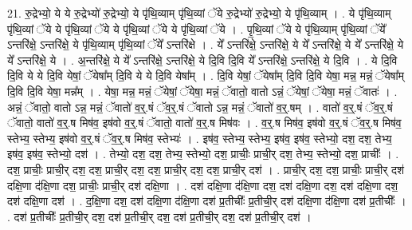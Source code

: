 \documentclass[17pt]{extarticle}
\begin{document}
21. रु॒द्रेभ्यो॒ ये ये रु॒द्रेभ्यो॑ रु॒द्रेभ्यो॒ ये पृ॑थि॒व्याम् पृ॑थि॒व्यां ॅये रु॒द्रेभ्यो॑ रु॒द्रेभ्यो॒ ये पृ॑थि॒व्याम् । . ये पृ॑थि॒व्याम् पृ॑थि॒व्यां ॅये ये पृ॑थि॒व्यां ॅये ये पृ॑थि॒व्यां ॅये ये पृ॑थि॒व्यां ॅये । . पृ॒थि॒व्यां ॅये ये पृ॑थि॒व्याम् पृ॑थि॒व्यां ॅये᳚ ऽन्तरि॑क्षे॒ ऽन्तरि॑क्षे॒ ये पृ॑थि॒व्याम् पृ॑थि॒व्यां ॅये᳚ ऽन्तरि॑क्षे । . ये᳚ ऽन्तरि॑क्षे॒ ऽन्तरि॑क्षे॒ ये ये᳚ ऽन्तरि॑क्षे॒ ये ये᳚ ऽन्तरि॑क्षे॒ ये ये᳚ ऽन्तरि॑क्षे॒ ये । . अ॒न्तरि॑क्षे॒ ये ये᳚ ऽन्तरि॑क्षे॒ ऽन्तरि॑क्षे॒ ये दि॒वि दि॒वि ये᳚ ऽन्तरि॑क्षे॒ ऽन्तरि॑क्षे॒ ये दि॒वि । . ये दि॒वि दि॒वि ये ये दि॒वि येषां॒ ॅयेषा᳚म् दि॒वि ये ये दि॒वि येषा᳚म् । . दि॒वि येषां॒ ॅयेषा᳚म् दि॒वि दि॒वि येषा॒ मन्न॒ मन्नं॒ ॅयेषा᳚म् दि॒वि दि॒वि येषा॒ मन्न᳚म् । . येषा॒ मन्न॒ मन्नं॒ ॅयेषां॒ ॅयेषा॒ मन्नं॒ ॅवातो॒ वातो ऽन्नं॒ ॅयेषां॒ ॅयेषा॒ मन्नं॒ ॅवातः॑ । . अन्नं॒ ॅवातो॒ वातो ऽन्न॒ मन्नं॒ ॅवातो॑ व॒र्॒.षं ॅव॒र्॒.षं ॅवातो ऽन्न॒ मन्नं॒ ॅवातो॑ व॒र्॒.षम् । . वातो॑ व॒र्॒.षं ॅव॒र्॒.षं ॅवातो॒ वातो॑ व॒र्॒.ष मिष॑व॒ इष॑वो व॒र्॒.षं ॅवातो॒ वातो॑ व॒र्॒.ष मिष॑वः । . व॒र्॒.ष मिष॑व॒ इष॑वो व॒र्॒.षं ॅव॒र्॒.ष मिष॑व॒ स्तेभ्य॒ स्तेभ्य॒ इष॑वो व॒र्॒.षं ॅव॒र्॒.ष मिष॑व॒ स्तेभ्यः॑ । . इष॑व॒ स्तेभ्य॒ स्तेभ्य॒ इष॑व॒ इष॑व॒ स्तेभ्यो॒ दश॒ दश॒ तेभ्य॒ इष॑व॒ इष॑व॒ स्तेभ्यो॒ दश॑ । . तेभ्यो॒ दश॒ दश॒ तेभ्य॒ स्तेभ्यो॒ दश॒ प्राचीः॒ प्राची॒र् दश॒ तेभ्य॒ स्तेभ्यो॒ दश॒ प्राचीः᳚ । . दश॒ प्राचीः॒ प्राची॒र् दश॒ दश॒ प्राची॒र् दश॒ दश॒ प्राची॒र् दश॒ दश॒ प्राची॒र् दश॑ । . प्राची॒र् दश॒ दश॒ प्राचीः॒ प्राची॒र् दश॑ दक्षि॒णा द॑क्षि॒णा दश॒ प्राचीः॒ प्राची॒र् दश॑ दक्षि॒णा । . दश॑ दक्षि॒णा द॑क्षि॒णा दश॒ दश॑ दक्षि॒णा दश॒ दश॑ दक्षि॒णा दश॒ दश॑ दक्षि॒णा दश॑ । . द॒क्षि॒णा दश॒ दश॑ दक्षि॒णा द॑क्षि॒णा दश॑ प्र॒तीचीः᳚ प्र॒तीची॒र् दश॑ दक्षि॒णा द॑क्षि॒णा दश॑ प्र॒तीचीः᳚ । . दश॑ प्र॒तीचीः᳚ प्र॒तीची॒र् दश॒ दश॑ प्र॒तीची॒र् दश॒ दश॑ प्र॒तीची॒र् दश॒ दश॑ प्र॒तीची॒र् दश॑ । \newline
\end{document}
